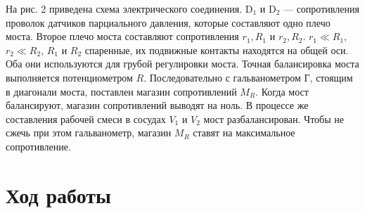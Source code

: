 \documentclass[a4paper,12pt]{article} %
\begin{document}
На рис. 2 приведена схема электрического соединения. D$_{1}$ и D$_{2}$ — сопротивления проволок датчиков парциального давления, которые составляют одно плечо моста. Второе плечо моста составляют сопротивления $r_{1}, R_{1}$ и $r_{2}, R_{2}$. $r_{1} \ll R_{1}$, $r_{2} \ll R_{2}$, $R_{1}$ и $R_{2}$ спаренные, их подвижные контакты находятся на общей оси. Оба они используются для грубой регулировки моста. Точная балансировка моста выполняется потенциометром $R$. Последовательно с гальванометром Г, стоящим в диагонали моста, поставлен магазин сопротивлений $M_{R}$. Когда мост балансируют, магазин сопротивлений выводят на ноль. В процессе же составления рабочей смеси в сосудах $V_{1}$ и $V_{2}$ мост разбалансирован. Чтобы не сжечь при этом гальванометр, магазин $M_{R}$ ставят на максимальное сопротивление.


\section*{Ход работы}
\end{document}
